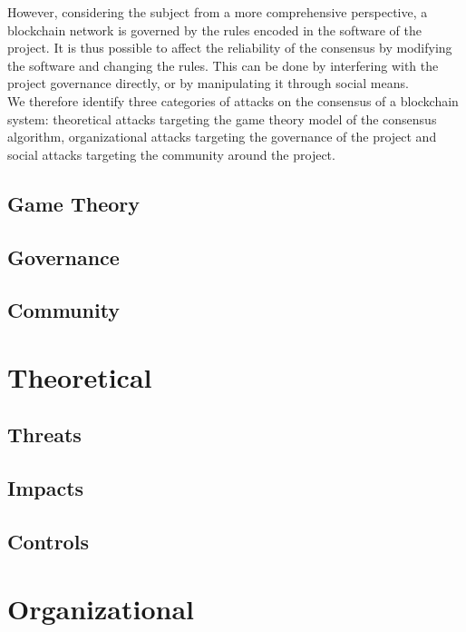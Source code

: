 \documentclass[11pt,a4paper,draft]{article}
\begin{document}
However, considering the subject from a more comprehensive perspective, a
blockchain network is governed by the rules encoded in the software of the
project. It is thus possible to affect the reliability of the consensus by
modifying the software and changing the rules. This can be done by interfering
with the project governance directly, or by manipulating it through social
means.\\

We therefore identify three categories of attacks on the consensus of a
blockchain system: theoretical attacks targeting the game theory model of the
consensus algorithm, organizational attacks targeting the governance of the
project and social attacks targeting the community around the project.\\

\subsection{Game Theory}

\subsection{Governance}

\subsection{Community}

\section{Theoretical}

\subsection{Threats}

\subsection{Impacts}

\subsection{Controls}

\section{Organizational}
\end{document}
